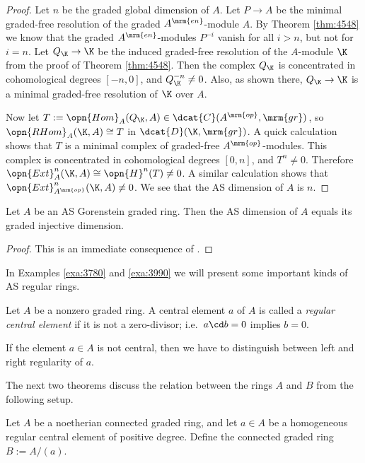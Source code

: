 \begin{proof}
Let $n$ be the graded global dimension of $A$. 
Let $P \to A$ be the minimal graded-free resolution of the graded
$A^{\mrm{en}}$-module $A$. By Theorem \ref{thm:4548} we know that the 
graded $A^{\mrm{en}}$-modules $P^{-i}$  vanish 
for all $i > n$, but not for $i = n$.  
Let $Q_{\K} \to \K$ be the induced graded-free resolution of the $A$-module 
$\K$ from the proof of Theorem \ref{thm:4548}. Then the complex 
$Q_{\K}$ is concentrated in cohomological degrees $[-n, 0]$, and 
$Q^{-n}_{\K} \neq 0$. Also, as shown there, $Q_{\K} \to \K$ is a 
minimal graded-free resolution of $\K$ over $A$. 

Now let 
$T := \opn{Hom}_A(Q_{\K}, A) \in \dcat{C}(A^{\mrm{op}}, \mrm{gr})$,
so $\opn{RHom}_A(\K, A) \cong T$ 
in $\dcat{D}(\K, \mrm{gr})$. A quick calculation 
shows that $T$ is a minimal complex of graded-free
$A^{\mrm{op}}$-modules. This complex is concentrated in cohomological degrees 
$[0, n]$, and $T^n \neq 0$. Therefore 
$\opn{Ext}^n_A(\K, A) \cong \opn{H}^n (T) \neq 0$.
A similar calculation shows that 
$\opn{Ext}^n_{A^{\mrm{op}}}(\K, A) \neq 0$.
We see that the AS dimension of $A$ is $n$. 
\end{proof}

\begin{prop} \label{prop:4561}
Let $A$ be an AS Gorenstein graded ring.
Then the AS dimension of $A$ equals its graded injective dimension. 
\end{prop}

\begin{proof}
This is an immediate consequence of \cite[Theorem 4.5]{Jor}. 
\end{proof}

In Examples \ref{exa:3780} and \ref{exa:3990} we will present some important 
kinds of AS regular rings. 

\begin{dfn} \label{dfn:4805}
Let $A$ be a nonzero graded ring. 
A central element $a$ of $A$ is called a {\em regular central element}
if it is not a zero-divisor; i.e.\ $a \cd b = 0$ implies $b = 0$. 
\end{dfn}

If the element $a \in A$ is not central, then we have to distinguish between 
left and right regularity of $a$.

The next two theorems discuss the relation between the rings $A$ and $B$ from 
the following setup.

\begin{setup} \label{set:4565}
Let $A$ be a noetherian connected graded ring, and let $a \in A$ be a
homogeneous regular central element of positive degree. Define the connected 
graded ring $B := A / (a)$.
\end{setup}

